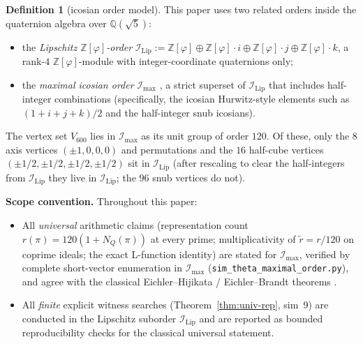 \documentclass[11pt,a4paper]{article}
\theoremstyle{definition}
\newtheorem{definition}[theorem]{Definition}
\theoremstyle{remark}
\newcommand{\Z}{\mathbb{Z}}
\newcommand{\Q}{\mathbb{Q}}
\newcommand{\IIlip}{\mathcal{I}_{\mathrm{Lip}}}
\newcommand{\IImax}{\mathcal{I}_{\mathrm{max}}}
\newcommand{\Zphi}{\Z[\varphi]}
\begin{document}
\begin{definition}[icosian order model]\label{def:order}
This paper uses two related orders inside the quaternion algebra over
$\Q(\sqrt 5)$:
\begin{itemize}
\item the \emph{Lipschitz $\Zphi$-order}
  $\IIlip := \Zphi \oplus \Zphi\!\cdot\! i \oplus \Zphi\!\cdot\! j \oplus \Zphi\!\cdot\! k$,
  a rank-$4$ $\Zphi$-module with integer-coordinate quaternions only;
\item the \emph{maximal icosian order} $\IImax$
  \cite{conwaySloane}, a strict superset of $\IIlip$ that includes
  half-integer combinations (specifically, the icosian Hurwitz-style
  elements such as $(1+i+j+k)/2$ and the half-integer snub icosians).
\end{itemize}

The vertex set $V_{600}$ lies in $\IImax$ as its unit group of order
$120$. Of these, only the $8$ axis vertices $(\pm 1, 0, 0, 0)$ and
permutations and the $16$ half-cube vertices $(\pm 1/2, \pm 1/2, \pm 1/2, \pm 1/2)$
sit in $\IIlip$ (after rescaling to clear the half-integers from
$\IIlip$ they live in $\IIlip$; the $96$ snub vertices do not).

\textbf{Scope convention.} Throughout this paper:
\begin{itemize}
\item All \emph{universal} arithmetic claims (representation count
  $r(\pi) = 120(1 + N_Q(\pi))$ at every prime; multiplicativity of
  $\widetilde r = r/120$ on coprime ideals; the exact L-function identity)
  are stated for $\IImax$, verified by complete short-vector enumeration in
  $\IImax$ (\texttt{sim\_theta\_maximal\_order.py}), and agree with the
  classical Eichler--Hijikata / Eichler--Brandt theorems
  \cite{eichler1958, hijikata1974}.
\item All \emph{finite} explicit witness searches (Theorem~\ref{thm:univ-rep},
  sim~9) are conducted in the Lipschitz suborder $\IIlip$ and are
  reported as bounded reproducibility checks for the classical
  universal statement.
\end{itemize}
\end{definition}
\end{document}
